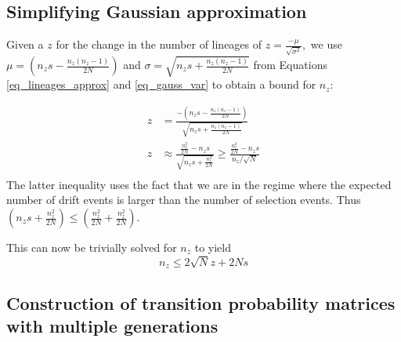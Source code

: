 \documentclass[9pt,twocolumn,twoside,lineno]{gsajnl}
\begin{document}
\subsection{Simplifying Gaussian approximation}
\label{subsec_apx_gauss}
Given a $z$ for the change in the number of lineages of $ z = \frac{-\mu}{\sqrt{\sigma^2}},$
we use $\mu=\left(  n_zs - \frac{n_z(n_z-1)}{2N} \right)$ and $\sigma = \sqrt{n_zs +
\frac{n_z(n_z-1)}{2N}}$ from Equations \ref{eq_lineages_approx} and \ref{eq_gauss_var} to obtain a bound for $n_z$:


\begin{equation}
\begin{aligned}
  z &= \frac{-\left(  n_zs - \frac{n_z(n_z-1)}{2N} \right)}	{\sqrt{n_zs + \frac{n_z(n_z-1)}{2N}}} \\
  z &\approx \frac{\frac{n_z^2}{2N} - n_z s}	{\sqrt{n_zs + \frac{n_z^2}{2N}}} \geq \frac{\frac{n_z^2}{2N} - n_z s}{n_z / \sqrt{N}} \\
 \end{aligned}
\end{equation}
 The latter inequality uses the fact that we are in the regime where the expected number of drift events is larger than the number of
 selection events. Thus $\left(n_zs +
\frac{n_z^2}{2N} \right) \leq \left(\frac{n_z^2}{2N} + \frac{n_z^2}{2N} \right)$.

 This can now be trivially solved for $n_z$ to yield
 \begin{equation}
  n_z \leq 2\sqrt{N}z + 2Ns
\end{equation}

\subsection{Construction of transition probability matrices with multiple generations}
\label{subsec_apx_multi}
\end{document}
